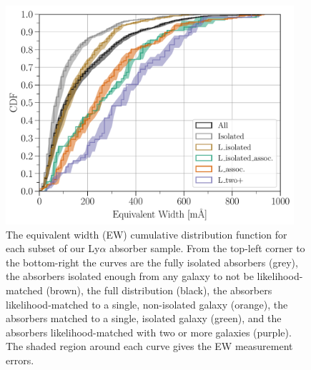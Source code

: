 \documentclass[twocolumn,tighten]{aastex62}
\begin{document}
\begin{figure}[ht!]
        \centering
        \vspace{0pt}
        \includegraphics[width=0.95\textwidth]{hist(EW)_all6_bins10_6alt_min_maxEW_0_10000_err.pdf}
        \caption{\small{The equivalent width (EW) cumulative distribution function for each subset of our Ly$\alpha$ absorber sample. From the top-left corner to the bottom-right the curves are the fully isolated absorbers (grey), the absorbers isolated enough from any galaxy to not be likelihood-matched (brown), the full distribution (black), the absorbers likelihood-matched to a single, non-isolated galaxy (orange), the absorbers matched to a single, isolated galaxy (green), and the absorbers likelihood-matched with two or more galaxies (purple). The shaded region around each curve gives the EW measurement errors.}}
        \vspace{-5pt}
        \label{cdf_ew}
\end{figure}
\end{document}

